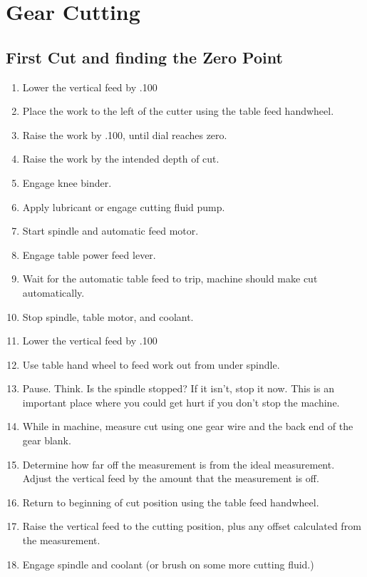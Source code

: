 \documentclass[12pt,twoside,letterpaper]{article}
\begin{document}
\section{Gear Cutting}
\subsection{First Cut and finding the Zero Point}
\begin{enumerate}
\item Lower the vertical feed by .100
\item Place the work to the left of the cutter using the table feed handwheel.
\item Raise the work by .100, until dial reaches zero.
\item Raise the work by the intended depth of cut.
\item Engage knee binder.
\item Apply lubricant or engage cutting fluid pump.
\item Start spindle and automatic feed motor.
\item Engage table power feed lever.
\item Wait for the automatic table feed to trip, machine should make cut automatically.
\item Stop spindle, table motor, and coolant.
\item Lower the vertical feed by .100
\item Use table hand wheel to feed work out from under spindle.
\item Pause. Think. Is the spindle stopped? If it isn't, stop it now. This is an important place where you could get hurt if you don't stop the machine.
\item While in machine, measure cut using one gear wire and the back end of the gear blank. 
\item Determine how far off the measurement is from the ideal measurement. Adjust the vertical feed by the amount that the measurement is off.
\item Return to beginning of cut position using the table feed handwheel.
\item Raise the vertical feed to the cutting position, plus any offset calculated from the measurement.
\item Engage spindle and coolant (or brush on some more cutting fluid.)
\end{enumerate}
\end{document}
